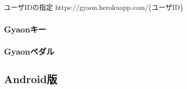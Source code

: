 \begin{itembox}[l]
{ユーザIDの指定}
https://gyaon.herokuapp.com/\{ユーザID\}
\end{itembox}

\subsubsection{Gyaonキー}

\subsubsection{Gyaonペダル}


\subsection{Android版}

